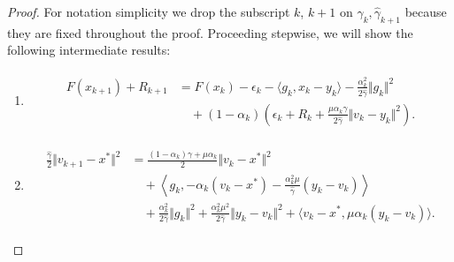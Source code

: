 \documentclass[12pt]{article}
\begin{document}
    \begin{proof}
        For notation simplicity we drop the subscript $k$, $k + 1$ on $\gamma_{k}, \hat \gamma_{k + 1}$ because they are fixed throughout the proof.
        Proceeding stepwise, we will show the following intermediate results:
        \begin{enumerate}
            \item
            \begin{align}\tag{Step 1}\label{eqn:stepwise-lya-proof-step-1}
                \begin{split}
                    F(x_{k + 1}) + R_{k + 1}
                    &=
                    F(x_k) - \epsilon_k - \langle  g_k, x_k - y_k\rangle
                    - \frac{\alpha_k^2}{2\hat \gamma}\Vert g_k\Vert^2
                    \\
                    &\quad
                        +
                        (1 - \alpha_k)
                        \left(
                            \epsilon_k + R_k +
                            \frac{\mu\alpha_k\gamma}{2\hat \gamma}
                            \Vert v_k - y_k\Vert^2
                        \right).
                \end{split}
            \end{align}
            \item
            \begin{align}\tag{Step 2}\label{eqn:stepwise-lya-proof-step-2}
                \begin{split}
                    \frac{\hat \gamma}{2}\Vert v_{k + 1} - x^* \Vert^2
                    &=
                    \frac{(1 - \alpha_k)\gamma + \mu \alpha_k}{2} \Vert v_k - x^*\Vert^2
                    \\
                    & \quad
                        +
                        \left\langle g_k,
                            - \alpha_k(v_k - x^*)
                            - \frac{\alpha_k^2\mu}{\hat \gamma}(y_k - v_k)
                        \right\rangle
                    \\
                    & \quad
                        + \frac{\alpha_k^2}{2\hat \gamma}\Vert g_k\Vert^2
                        + \frac{\alpha_k^2 \mu^2}{2\hat \gamma}\Vert y_k - v_k\Vert^2
                        + \langle v_k - x^*, \mu\alpha_k(y_k - v_k)\rangle.
                \end{split}
            \end{align}

\end{enumerate}
\end{proof}
\end{document}
